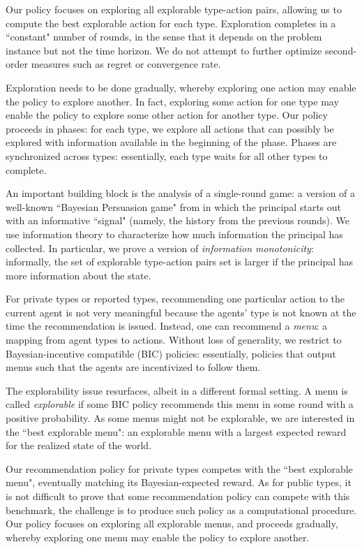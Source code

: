 Our policy focuses on exploring all explorable type-action pairs, allowing us to compute the best explorable action for each type. Exploration completes in a ``constant" number of rounds, in the sense that it depends on the problem instance but not the time horizon. We do not attempt to further optimize second-order measures such as regret or convergence rate.

Exploration needs to be done gradually, whereby exploring one action may enable the policy to explore another. In fact, exploring some action for one type may enable the policy to explore some other action for another type. Our policy proceeds in phases: for each type, we explore all actions that can possibly be explored with information available in the beginning of the phase. Phases are synchronized across types: essentially, each type waits for all other types to complete.

An important building block is the analysis of a single-round game: a version of a well-known ``Bayesian Persuasion game" from \cite{Kamenica-aer11} in which the principal starts out with an informative ``signal" (namely, the history from the previous rounds). We use information theory to characterize how much information the principal has collected. In particular, we prove a version of \emph{information monotonicity}: informally, the set of explorable type-action pairs set is larger if the principal has more information about the state.


For private types or reported types, recommending one particular action to the current agent is not very meaningful because the agents' type is not known at the time the recommendation is issued. Instead, one can recommend a \emph{menu}: a mapping from agent types to actions. Without loss of generality, we restrict to  Bayesian-incentive compatible (BIC) policies: essentially, policies that output menus such that the agents are incentivized to follow them.

The explorability issue resurfaces, albeit in a different formal setting. A menu is called \emph{explorable} if some BIC policy recommends this menu in some round with a positive probability. As some menus might not be explorable, we are interested in the ``best explorable menu": an explorable menu with a largest expected reward for the realized state of the world.

Our recommendation policy for private types competes with the ``best explorable menu", eventually matching its Bayesian-expected reward. As for public types, it is not difficult to prove that some recommendation policy can compete with this benchmark, the challenge is to produce such policy as a computational procedure. Our policy focuses on exploring all explorable menus, and proceeds gradually, whereby exploring one menu may enable the policy to explore another.

